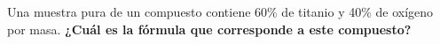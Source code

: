 Una muestra pura de un compuesto contiene 60\% de titanio y 40\% de oxígeno por masa.
\textbf{¿Cuál es la fórmula que corresponde a este compuesto?}

\begin{oneparchoices}
    \choice  {}
    \choice  {}
    \choice  {}
    \choice  {}
\end{oneparchoices}